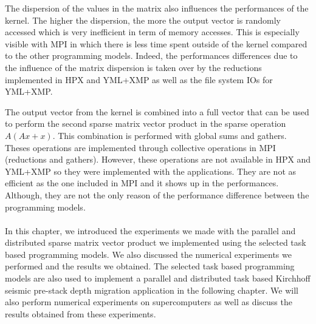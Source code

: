 The dispersion of the values in the matrix also influences the performances of the kernel.
The higher the dispersion, the more the output vector is randomly accessed which is very inefficient in term of memory accesses.
This is especially visible with MPI in which there is less time spent outside of the kernel compared to the other programming models.
Indeed, the performances differences due to the influence of the matrix dispersion is taken over by the reductions implemented in HPX and YML+XMP as well as the file system IOs for YML+XMP.

The output vector from the kernel is combined into a full vector that can be used to perform the second sparse matrix vector product in the sparse operation $A(Ax+x)$.
This combination is performed with global sums and gathers.
Theses operations are implemented through collective operations in MPI (reductions and gathers).
However, these operations are not available in HPX and YML+XMP so they were implemented with the applications.
They are not as efficient as the one included in MPI and it shows up in the performances.
Although, they are not the only reason of the performance difference between the programming models.


\paragraph{}
In this chapter, we introduced the experiments we made with the parallel and distributed sparse matrix vector product we implemented using the selected task based programming models.
We also discussed the numerical experiments we performed and the results we obtained.
The selected task based programming models are also used to implement a parallel and distributed task based Kirchhoff seismic pre-stack depth migration application in the following chapter.
We will also perform numerical experiments on supercomputers as well as discuss the results obtained from these experiments.
